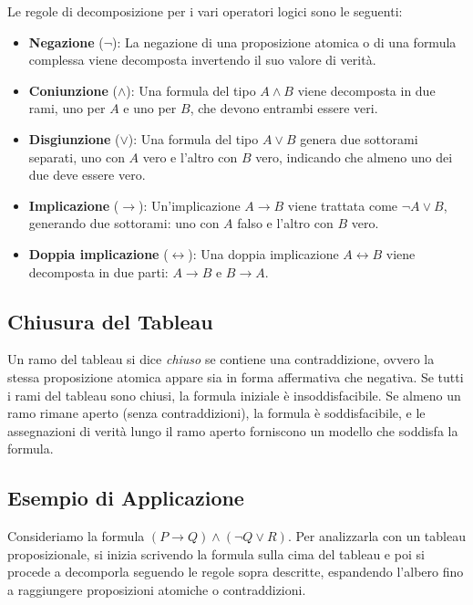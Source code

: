 \documentclass{article}
\begin{document}
Le regole di decomposizione per i vari operatori logici sono le seguenti:

\begin{itemize}
    \item \textbf{Negazione} ($\neg$): La negazione di una proposizione atomica o di una formula complessa viene decomposta invertendo il suo valore di verità.
    \item \textbf{Coniunzione} ($\land$): Una formula del tipo $A \land B$ viene decomposta in due rami, uno per $A$ e uno per $B$, che devono entrambi essere veri.
    \item \textbf{Disgiunzione} ($\lor$): Una formula del tipo $A \lor B$ genera due sottorami separati, uno con $A$ vero e l'altro con $B$ vero, indicando che almeno uno dei due deve essere vero.
    \item \textbf{Implicazione} ($\rightarrow$): Un'implicazione $A \rightarrow B$ viene trattata come $\neg A \lor B$, generando due sottorami: uno con $A$ falso e l'altro con $B$ vero.
    \item \textbf{Doppia implicazione} ($\leftrightarrow$): Una doppia implicazione $A \leftrightarrow B$ viene decomposta in due parti: $A \rightarrow B$ e $B \rightarrow A$.
\end{itemize}

\subsection{Chiusura del Tableau}

Un ramo del tableau si dice \textit{chiuso} se contiene una contraddizione, ovvero la stessa proposizione atomica appare sia in forma affermativa che negativa. Se tutti i rami del tableau sono chiusi, la formula iniziale è insoddisfacibile. Se almeno un ramo rimane aperto (senza contraddizioni), la formula è soddisfacibile, e le assegnazioni di verità lungo il ramo aperto forniscono un modello che soddisfa la formula.

\subsection{Esempio di Applicazione}

Consideriamo la formula $(P \rightarrow Q) \land (\neg Q \lor R)$. Per analizzarla con un tableau proposizionale, si inizia scrivendo la formula sulla cima del tableau e poi si procede a decomporla seguendo le regole sopra descritte, espandendo l'albero fino a raggiungere proposizioni atomiche o contraddizioni.
\end{document}
